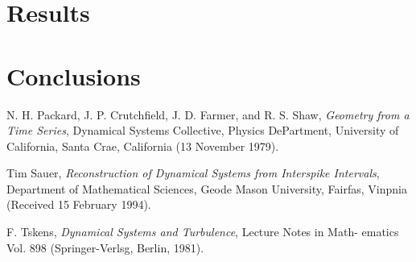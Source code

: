 \documentclass[10pt]{article}
\begin{document}
\section{Results}

\section{Conclusions}

\begin{thebibliography}{99}
 
N. H. Packard, J. P. Crutchfield, J. D. Farmer, and R. S. Shaw, {\it Geometry from a Time Series}, Dynamical Systems Collective, Physics DePartment, University of California, Santa Crae, California (13 November 1979).

Tim Sauer, {\it Reconstruction of Dynamical Systems from Interspike Intervals}, Department of Mathematical Sciences, Geode Mason University, Fairfas, Vinpnia (Received 15 February 1994).

F. Tskens, {\it Dynamical Systems and Turbulence}, Lecture Notes in Math-
ematics Vol. 898 (Springer-Verlsg, Berlin, 1981).

\end{thebibliography}
\end{document}
